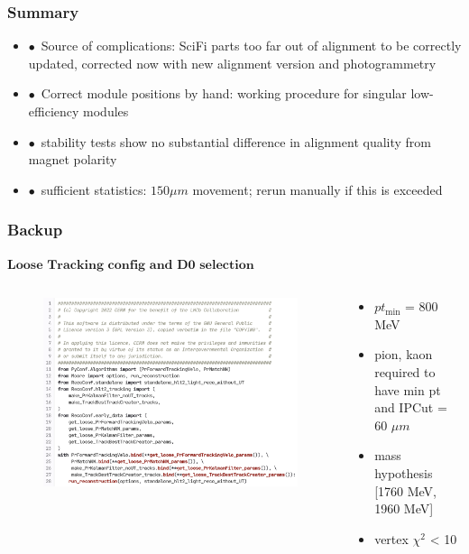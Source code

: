 \documentclass[xcolor=dvipsnames, aspectratio=1610, 12pt]{beamer}
\begin{document}
\begin{frame}\frametitle{Summary}
  \begin{itemize}
    \setlength\itemsep{0em}
    \item $\bullet$\, Source of complications: SciFi parts too far out of alignment to be correctly updated, corrected now with new alignment version and photogrammetry
    \item $\bullet$\, Correct module positions by hand: working procedure for singular low-efficiency modules
    \item $\bullet$\, stability tests show no substantial difference in alignment quality from magnet polarity
    \item $\bullet$\, sufficient statistics: $150 \mu m$ movement; rerun manually if this is exceeded
  \end{itemize}
\end{frame}

%  

\begin{frame}\frametitle{Backup}
  $\textbf{Loose Tracking config and D0 selection}$
  \begin{columns}
    \begin{column}[c]{0.48\textwidth}
      \begin{figure}
        \includegraphics[width=\textwidth]{plots/loose_tracking.png}
      \end{figure}
    \end{column}
    \begin{column}[c]{0.48\textwidth}
      \begin{itemize}
        \item $pt_\text{min}$ = 800 MeV
        \item pion, kaon required to have min pt and IPCut = 60 $\mu m$
        \item mass hypothesis [1760 MeV, 1960 MeV]
        \item vertex $\chi^2$ < 10
      \end{itemize}
    \end{column}
  \end{columns}
\end{frame}
\end{document}
